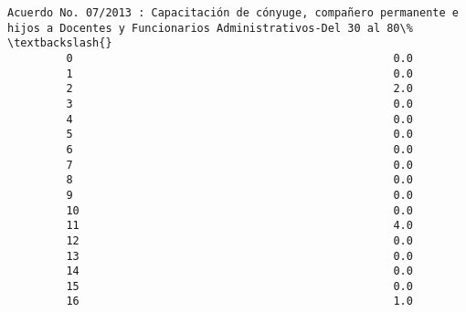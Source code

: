 \documentclass[11pt]{article}
\begin{document}
\begin{Verbatim}[commandchars=\\\{\}]
             Acuerdo No. 07/2013 : Capacitación de cónyuge, compañero permanente e hijos a Docentes y Funcionarios Administrativos-Del 30 al 80\%   \textbackslash{}
         0                                                 0.0                                                                                      
         1                                                 0.0                                                                                      
         2                                                 2.0                                                                                      
         3                                                 0.0                                                                                      
         4                                                 0.0                                                                                      
         5                                                 0.0                                                                                      
         6                                                 0.0                                                                                      
         7                                                 0.0                                                                                      
         8                                                 0.0                                                                                      
         9                                                 0.0                                                                                      
         10                                                0.0                                                                                      
         11                                                4.0                                                                                      
         12                                                0.0                                                                                      
         13                                                0.0                                                                                      
         14                                                0.0                                                                                      
         15                                                0.0                                                                                      
         16                                                1.0                                                                                      

\end{Verbatim}
\end{document}
